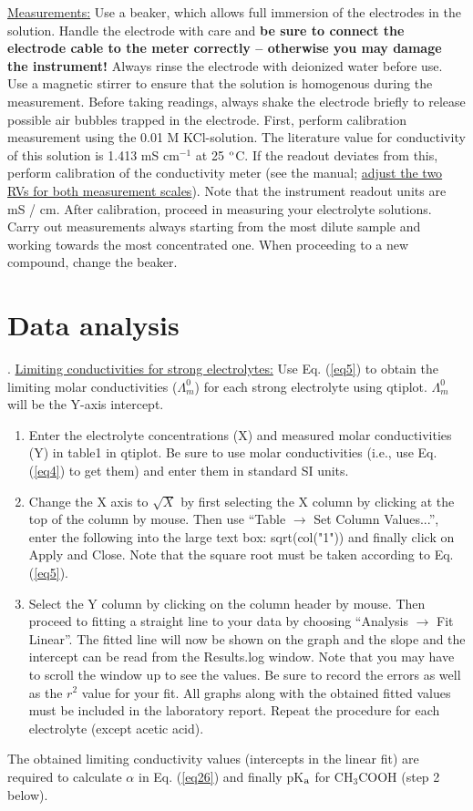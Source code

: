 \documentclass[byrevtex,amssymb,aps,pra,floatfix,letterpaper]{revtex4}
\begin{document}
\noindent
\underline{Measurements:} Use a beaker, which allows full immersion of the electrodes in the solution. Handle the electrode with care and \textbf{be sure to connect the electrode cable to the meter correctly -- otherwise you may damage the instrument!} Always rinse the electrode with deionized water before use. Use a magnetic stirrer to ensure that the solution is homogenous during the measurement. Before taking readings, always shake the electrode briefly to release possible air bubbles trapped in the electrode. First, perform calibration measurement using the 0.01 M KCl-solution. The literature value for conductivity of this solution is 1.413 mS cm$^{-1}$ at 25 $^\textnormal{o}$C. If the readout deviates from this, perform calibration of the conductivity meter (see the manual; \underline{adjust the two RVs for both measurement scales}). Note that the instrument readout units are mS / cm. After calibration, proceed in measuring your electrolyte solutions. Carry out measurements always starting from the most dilute sample and working towards the most concentrated one. When proceeding to a new compound, change the beaker.

\section{Data analysis}

. \underline{Limiting conductivities for strong electrolytes:} Use Eq. (\ref{eq5}) to obtain the limiting molar conductivities ($\Lambda_m^0$) for each strong electrolyte using qtiplot. $\Lambda_m^0$ will be the Y-axis intercept.
\begin{enumerate}
\item Enter the electrolyte concentrations (X) and measured molar conductivities (Y) in table1 in qtiplot. Be sure to use molar conductivities (i.e., use Eq. (\ref{eq4}) to get them) and enter them in standard SI units.
\item Change the X axis to $\sqrt{X}$ by first selecting the X column by clicking at the top of the column by mouse. Then use ``Table $\rightarrow$ Set Column Values...'', enter the following into the large text box: sqrt(col("1")) and finally click on Apply and Close. Note that the square root must be taken according to Eq. (\ref{eq5}).
\item Select the Y column by clicking on the column header by mouse. Then proceed to fitting a straight line to your data by choosing ``Analysis $\rightarrow$ Fit Linear''. The fitted line will now be shown on the graph and the slope and the intercept can be read from the Results.log window. Note that you may have to scroll the window up to see the values. Be sure to record the errors as well as the $r^2$ value for your fit. All graphs along with the obtained fitted values must be included in the laboratory report. Repeat the procedure for each electrolyte (except acetic acid).
\end{enumerate}
The obtained limiting conductivity values (intercepts in the linear fit) are required to calculate $\alpha$ in Eq. (\ref{eq26}) and finally pK$_\textnormal{a}$ for CH$_3$COOH (step 2 below).\\
\end{document}
